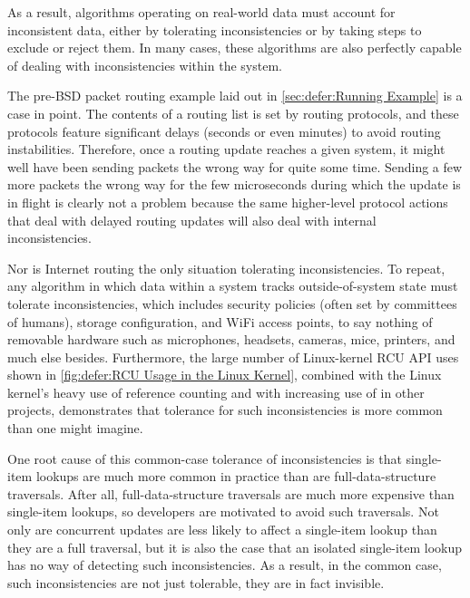 As a result, algorithms operating on real-world data must account for
inconsistent data, either by tolerating inconsistencies or by taking
steps to exclude or reject them.
In many cases, these algorithms are also perfectly capable of dealing
with inconsistencies within the system.

The pre-BSD packet routing example laid out in
\cref{sec:defer:Running Example}
is a case in point.
The contents of a routing list is set by routing protocols, and these
protocols feature significant delays (seconds or even minutes) to avoid
routing instabilities.
Therefore, once a routing update reaches a given system,
it might well have been sending packets the wrong way for quite some time.
Sending a few more packets the wrong way for the few microseconds during
which the update is in flight is clearly not a problem because the same
higher-level protocol actions that deal with delayed routing updates
will also deal with internal inconsistencies.

Nor is Internet routing the only situation tolerating inconsistencies.
To repeat, any algorithm in which data within a system tracks
outside-of-system state must tolerate inconsistencies, which includes
security policies (often set by committees of humans), storage configuration,
and WiFi access points, to say nothing of removable hardware such as
microphones, headsets, cameras, mice, printers, and much else besides.
Furthermore, the large number of Linux-kernel RCU API uses shown in
\cref{fig:defer:RCU Usage in the Linux Kernel},
combined with the Linux kernel's heavy use of reference counting
and with increasing use of  in other projects, demonstrates
that tolerance for such inconsistencies is more common than one might
imagine.

One root cause of this common-case tolerance of inconsistencies is
that single-item lookups are much more common in practice than are
full-data-structure traversals.
After all, full-data-structure traversals are much more expensive than
single-item lookups, so developers are motivated to avoid such traversals.
Not only are concurrent updates are less likely to affect a single-item
lookup than they are a full traversal, but it is also the case that an
isolated single-item lookup has no way of detecting such inconsistencies.
As a result, in the common case, such inconsistencies are not just
tolerable, they are in fact invisible.


